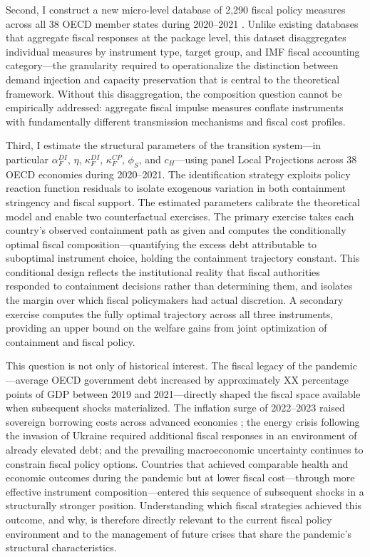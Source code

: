 Second, I construct a new micro-level database of 2,290 fiscal policy measures across all 38 OECD member states during 2020--2021 \citep{pesenti2025}. Unlike existing databases that aggregate fiscal responses at the package level, this dataset disaggregates individual measures by instrument type, target group, and IMF fiscal accounting category---the granularity required to operationalize the distinction between demand injection and capacity preservation that is central to the
theoretical framework. Without this disaggregation, the composition question cannot be empirically addressed: aggregate fiscal impulse measures conflate instruments with fundamentally different transmission mechanisms and fiscal cost profiles.

Third, I estimate the structural parameters of the transition system---in particular $\alpha_F^{DI}$, $\eta$, $\kappa_F^{DI}$, $\kappa_F^{CP}$, $\phi_S$, and $c_H$---using panel Local Projections \citep{jorda2005, jorda2025} across 38 OECD economies during 2020--2021. The identification strategy exploits policy reaction function residuals to isolate exogenous variation in both containment stringency and fiscal support. The estimated parameters calibrate the theoretical model and enable two counterfactual exercises. The primary exercise takes each country's observed containment path as given and computes the conditionally optimal fiscal composition---quantifying the excess debt attributable to suboptimal instrument choice, holding the containment trajectory constant. This conditional design reflects the institutional
reality that fiscal authorities responded to containment decisions rather than determining them, and isolates the margin over which fiscal policymakers had actual discretion. A secondary exercise computes the fully optimal trajectory across all three instruments, providing an upper bound on the welfare gains from joint optimization of containment and fiscal policy.

This question is not only of historical interest. The fiscal legacy of the pandemic---average OECD government debt increased by approximately XX percentage points of GDP between 2019 and 2021---directly shaped the fiscal space available when subsequent shocks materialized. The inflation surge of 2022--2023 raised sovereign borrowing costs across advanced economies \citep{jorda2023}; the energy crisis following the invasion of Ukraine required additional fiscal responses in an environment of already elevated debt; and the prevailing macroeconomic uncertainty continues to constrain fiscal policy options. Countries that achieved comparable health and economic outcomes during the pandemic but at lower fiscal
cost---through more effective instrument composition---entered this sequence of subsequent shocks in a structurally stronger position. Understanding which fiscal strategies achieved this outcome, and why, is therefore directly relevant to the current fiscal policy environment and to the management of future crises that share the pandemic's structural characteristics.

